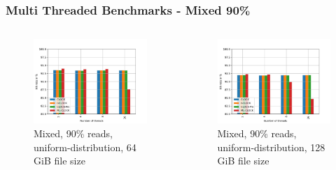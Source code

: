 \documentclass[
	aspectratio=169,
	compress,
]{beamer}
\newcommand{\navframetitle}[1]{\frametitle{#1\hfill{\footnotesize\lastsection{}}}}
\begin{document}
\begin{frame}[fragile]
	\navframetitle{Multi Threaded Benchmarks - Mixed 90\%}

	\begin{columns}
		\begin{column}{0.5\textwidth}
			\begin{figure}[ht]
    			\centering
    			\includegraphics[width=\textwidth]{multi_64_gb_rw_90to10_uniform.jpg}
        		\caption{Mixed, 90\% reads, uniform-distribution, 64 GiB file size}
			\end{figure}
		\end{column}
		\begin{column}{0.5\textwidth}
			\begin{figure}[ht]
    			\centering
    			\includegraphics[width=\textwidth]{multi_128_gb_rw_90to10_uniform.jpg}
        		\caption{Mixed, 90\% reads, uniform-distribution, 128 GiB file size}
			\end{figure}			
		\end{column}
	\end{columns}
\end{frame}
\end{document}

